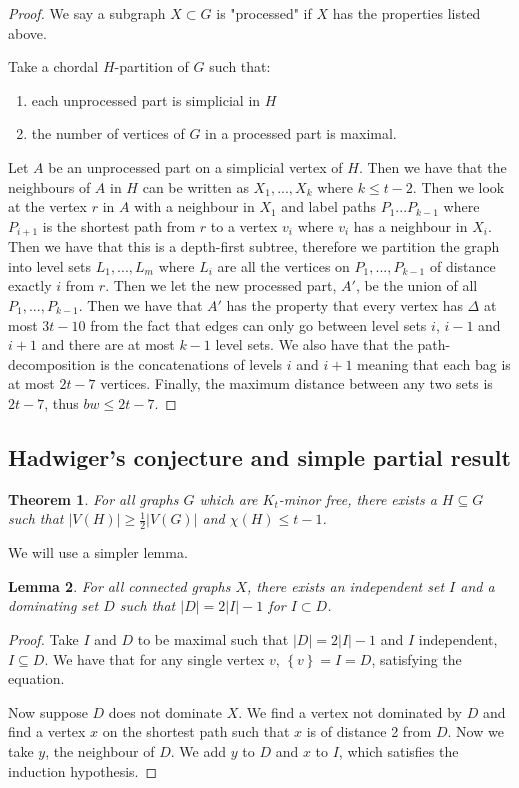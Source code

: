 \documentclass[]{article}
\newtheorem{theorem}{Theorem}
\newtheorem{lemma}[theorem]{Lemma}
\theoremstyle{definition}
\numberwithin{theorem}{section}
\numberwithin{equation}{section}
\begin{document}
\begin{proof}
	We say a subgraph $X \subset G$ is "processed" if $X$ has the properties listed above.
	
	Take a chordal $H$-partition of $G$ such that:
	\begin{enumerate}
		\item each unprocessed part is simplicial in $H$
		\item the number of vertices of $G$ in a processed part is maximal. 
	\end{enumerate}
	Let $A$ be an unprocessed part on a simplicial vertex of $H$. Then we have that the neighbours of $A$ in $H$ can be written as $X_1, ..., X_k$ where $k \leq t - 2$. Then we look at the vertex $r$ in $A$ with a neighbour in $X_1$ and label paths $P_1 ... P_{k - 1}$ where $P_{i + 1}$ is the shortest path from $r$ to a vertex $v_i$ where $v_i$ has a neighbour in $X_i$. Then we have that this is a depth-first subtree, therefore we partition the graph into level sets $L_1, ..., L_m$ where $L_i$ are all the vertices on $P_1, ..., P_{k - 1}$ of distance exactly $i$ from $r$. Then we let the new processed part, $A'$, be the union of all $P_1, ..., P_{k - 1}$. Then we have that $A'$ has the property that every vertex has $\Delta$ at most $3t - 10$ from the fact that edges can only go between level sets $i$, $i-1$ and $i + 1$ and there are at most $k-1$ level sets. We also have that the path-decomposition is the concatenations of levels $i$ and $i + 1$ meaning that each bag is at most $2t - 7$ vertices. Finally, the maximum distance between any two sets is $2t - 7$, thus $bw \leq 2t - 7$.
\end{proof}

\subsection{Hadwiger's conjecture and simple partial result}

\begin{theorem}
	For all graphs $G$ which are $K_t$-minor free, there exists a $H \subseteq G$ such that $|V(H)| \geq \frac{1}{2}|V(G)|$ and $\chi(H) \leq t - 1$.
\end{theorem}
We will use a simpler lemma.

\begin{lemma}
	For all connected graphs $X$, there exists an independent set $I$ and a dominating set $D$ such that $|D| = 2 |I| - 1$ for $I \subset D$. 
\end{lemma}
\begin{proof}
	Take $I$ and $D$ to be maximal such that $|D| = 2|I| - 1$ and $I$ independent, $I \subseteq D$. We have that for any single vertex $v$, $\left\lbrace v \right\rbrace = I = D$, satisfying the equation.
	
	Now suppose $D$ does not dominate $X$. We find a vertex not dominated by $D$ and find a vertex $x$ on the shortest path such that $x$ is of distance 2 from $D$. Now we take $y$, the neighbour of $D$. We add $y$ to $D$ and $x$ to $I$, which satisfies the induction hypothesis.
\end{proof}
\end{document}

